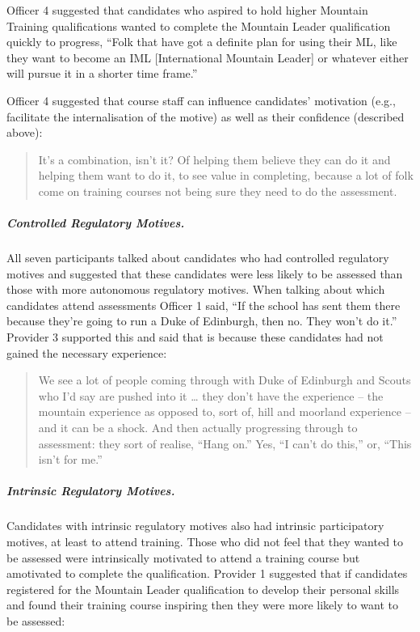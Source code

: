 \documentclass[
  12pt,
  a4paper,
]{book}
\begin{document}
Officer 4 suggested that candidates who aspired to hold higher Mountain Training qualifications wanted to complete the Mountain Leader qualification quickly to progress, ``Folk that have got a definite plan for using their ML, like they want to become an IML {[}International Mountain Leader{]} or whatever either will pursue it in a shorter time frame.''

Officer 4 suggested that course staff can influence candidates' motivation (e.g., facilitate the internalisation of the motive) as well as their confidence (described above):

\begin{quote}
It's a combination, isn't it? Of helping them believe they can do it and helping them want to do it, to see value in completing, because a lot of folk come on training courses not being sure they need to do the assessment.
\end{quote}

\hypertarget{controlled-regulatory-motives.}{%
\subparagraph{Controlled Regulatory Motives.}\label{controlled-regulatory-motives.}}

All seven participants talked about candidates who had controlled regulatory motives and suggested that these candidates were less likely to be assessed than those with more autonomous regulatory motives. When talking about which candidates attend assessments Officer 1 said, ``If the school has sent them there because they're going to run a Duke of Edinburgh, then no. They won't do it.'' Provider 3 supported this and said that is because these candidates had not gained the necessary experience:

\begin{quote}
We see a lot of people coming through with Duke of Edinburgh and Scouts who I'd say are pushed into it \ldots{} they don't have the experience -- the mountain experience as opposed to, sort of, hill and moorland experience -- and it can be a shock. And then actually progressing through to assessment: they sort of realise, ``Hang on.'' Yes, ``I can't do this,'' or, ``This isn't for me.''
\end{quote}

\hypertarget{intrinsic-regulatory-motives.}{%
\subparagraph{Intrinsic Regulatory Motives.}\label{intrinsic-regulatory-motives.}}

Candidates with intrinsic regulatory motives also had intrinsic participatory motives, at least to attend training. Those who did not feel that they wanted to be assessed were intrinsically motivated to attend a training course but amotivated to complete the qualification. Provider 1 suggested that if candidates registered for the Mountain Leader qualification to develop their personal skills and found their training course inspiring then they were more likely to want to be assessed:
\end{document}
